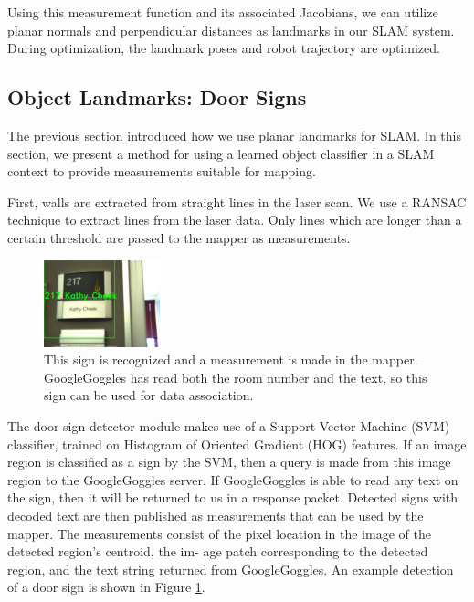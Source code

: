 \documentclass[3p]{elsarticle}
\begin{document}
Using this measurement function and its associated Jacobians, we can utilize planar normals and perpendicular distances as landmarks in our SLAM system. During
optimization, the landmark poses and robot trajectory are optimized.

\subsection{Object Landmarks: Door Signs}
\label{sec:door_signs}

The previous section introduced how we use planar landmarks for SLAM. In this section, we present a method for using a learned object classifier in a SLAM context to provide measurements suitable for mapping.

First, walls are extracted from straight lines in the laser scan. We use a
RANSAC technique to extract lines from the laser data. Only lines which are longer than a certain threshold are passed to the mapper as measurements.

\begin{figure}[ht!]
\begin{center}
\centering
\includegraphics[width=0.3\textwidth]{pics/door_sign}
\caption{This sign is recognized and a measurement is made in the mapper. GoogleGoggles has read both the room number and the text, so this sign can be used for
data association.} 
\label{fig:door_sign}
\end{center}
\end{figure}

The door-sign-detector module makes use of a Support Vector Machine (SVM) classifier, trained on Histogram of Oriented
Gradient (HOG) features. If an image region
is classified as a sign by the SVM, then a query is made from this image region to
the GoogleGoggles server. If GoogleGoggles is able to read any text on the sign, then
it will be returned to us in a response packet. Detected signs with decoded text are
then published as measurements that can be used by the mapper. The measurements
consist of the pixel location in the image of the detected region’s centroid, the im-
age patch corresponding to the detected region, and the text string returned from
GoogleGoggles. An example detection of a door sign is shown in Figure \ref{fig:door_sign}.
\end{document}
